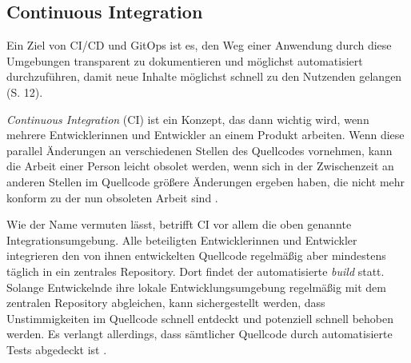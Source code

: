 \documentclass[11pt,a4paper]{article}
\begin{document}

\subsection{Continuous Integration}
Ein Ziel von CI/CD und GitOps ist es, den Weg einer Anwendung durch
diese Umgebungen transparent zu dokumentieren und möglichst automatisiert
durchzuführen, damit neue Inhalte möglichst schnell zu den
Nutzenden gelangen \cite{cicd_with_kubernetes_devops} (S. 12).

\emph{Continuous Integration} (CI) ist ein Konzept, das dann wichtig wird, wenn mehrere
Entwicklerinnen und Entwickler an einem Produkt arbeiten.
Wenn diese parallel Änderungen an verschiedenen Stellen des Quellcodes
vornehmen, kann die Arbeit einer Person leicht obsolet werden,
wenn sich in der Zwischenzeit an anderen Stellen im Quellcode größere
Änderungen ergeben haben, die nicht mehr konform zu der nun obsoleten Arbeit sind \cite{fowler_Continuous_Integration}.

Wie der Name vermuten lässt, betrifft CI vor allem die oben genannte Integrationsumgebung.
Alle beteiligten Entwicklerinnen und Entwickler integrieren den von ihnen
entwickelten Quellcode regelmäßig aber mindestens täglich in ein zentrales
Repository. Dort findet der automatisierte \emph{build} statt.
Solange Entwickelnde ihre lokale Entwicklungsumgebung regelmäßig mit dem
zentralen Repository abgleichen, kann sichergestellt werden, dass
Unstimmigkeiten im Quellcode schnell entdeckt und potenziell schnell behoben werden.
Es verlangt allerdings, dass sämtlicher Quellcode durch automatisierte
Tests abgedeckt ist \cite{fowler_Continuous_Integration}.
\end{document}
